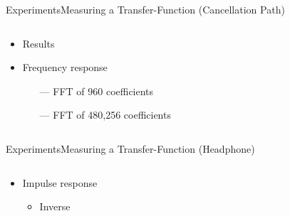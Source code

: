 \begin{frame}{Experiments}{Measuring a Transfer-Function (Cancellation Path)}		
	\begin{columns}
		\begin{column}{0.3\textwidth}
			\begin{itemize}
				\item Results
				\item Frequency response
				\begin{itemize}
					\item[\textcolor{MATLABorange}{---}] FFT of 960 coefficients
					\item[\textcolor{MATLABblue}{---}] FFT of 480,256 coefficients
				\end{itemize}
			\end{itemize}
		\end{column}
		\begin{column}{0.7\textwidth} 
			\begin{figure}[h]
				
			\end{figure}
		\end{column}
	\end{columns}
\end{frame}
\begin{frame}{Experiments}{Measuring a Transfer-Function (Headphone)}		
	\begin{columns}
		\begin{column}{1\textwidth}
			\begin{itemize}
				\item Impulse response
				\begin{itemize}
					\item Inverse
				\end{itemize}
			\end{itemize}
			\begin{figure}[h]
				
			\end{figure}
		\end{column}
	\end{columns}
\end{frame}


